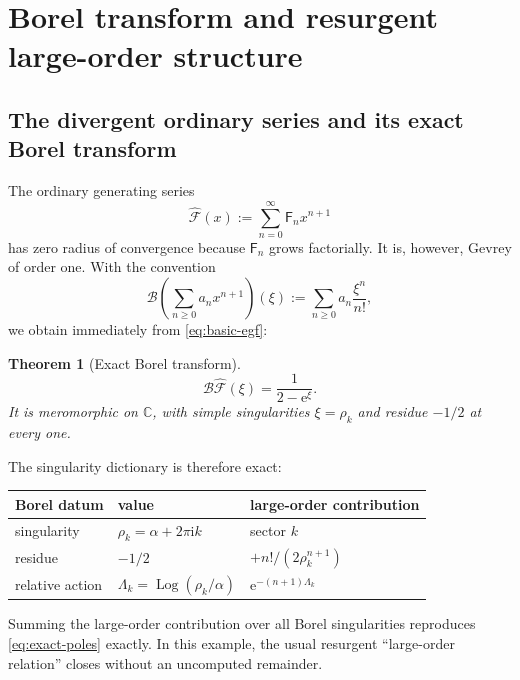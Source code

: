 \documentclass[11pt,a4paper]{article}
\newtheorem{theorem}{Theorem}[section]
\theoremstyle{definition}
\theoremstyle{remark}
\newcommand{\Fub}{\mathsf F}
\newcommand{\e}{\mathrm e}
\newcommand{\ii}{\mathrm i}
\newcommand{\Log}{\operatorname{Log}}
\newcommand{\Borel}{\mathcal B}
\newcommand{\C}{\mathbb C}
\begin{document}
\section{Borel transform and resurgent large-order structure}

\subsection{The divergent ordinary series and its exact Borel transform}

The ordinary generating series
\begin{equation}\label{eq:formal-ogf}
 \widehat{\mathcal F}(x):=\sum_{n=0}^{\infty}\Fub_nx^{n+1}
\end{equation}
has zero radius of convergence because \(\Fub_n\) grows factorially.  It is,
however, Gevrey of order one.  With the convention
\begin{equation}\label{eq:borel-def}
 \Borel\left(\sum_{n\ge0}a_nx^{n+1}\right)(\xi)
 :=\sum_{n\ge0}a_n\frac{\xi^n}{n!},
\end{equation}
we obtain immediately from \eqref{eq:basic-egf}:

\begin{theorem}[Exact Borel transform]\label{thm:borel}
\begin{equation}\label{eq:borel-exact}
 \boxed{\displaystyle
 \Borel\widehat{\mathcal F}(\xi)=\frac1{2-\e^\xi}}.
\end{equation}
It is meromorphic on \(\C\), with simple singularities
\(\xi=\rho_k\) and residue \(-1/2\) at every one.
\end{theorem}

The singularity dictionary is therefore exact:
\begin{center}
\begin{tabular}{@{}lll@{}}
\toprule
Borel datum&value&large-order contribution\\
\midrule
singularity&\(\rho_k=\alpha+2\pi\ii k\)&sector \(k\)\\
residue&\(-1/2\)&\(+n!/(2\rho_k^{n+1})\)\\
relative action&\(\Lambda_k=\Log(\rho_k/\alpha)\)&\(\e^{-(n+1)\Lambda_k}\)\\
\bottomrule
\end{tabular}
\end{center}
Summing the large-order contribution over all Borel singularities reproduces
\eqref{eq:exact-poles} exactly.  In this example, the usual resurgent
``large-order relation'' closes without an uncomputed remainder.
\end{document}
